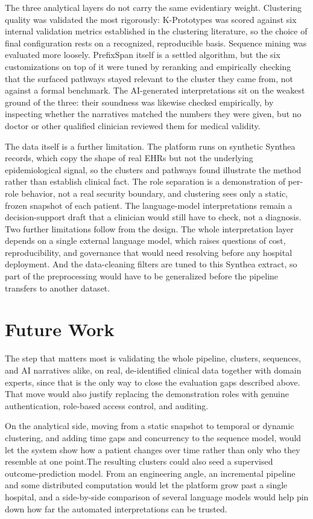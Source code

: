 The three analytical layers do not carry the same evidentiary weight. Clustering quality was validated the most rigorously: K-Prototypes was scored against six internal validation metrics established in the clustering literature, so the choice of final configuration rests on a recognized, reproducible basis. Sequence mining was evaluated more loosely. PrefixSpan itself is a settled algorithm, but the six customizations on top of it were tuned by reranking and empirically checking that the surfaced pathways stayed relevant to the cluster they came from, not against a formal benchmark. The AI-generated interpretations sit on the weakest ground of the three: their soundness was likewise checked empirically, by inspecting whether the narratives matched the numbers they were given, but no doctor or other qualified clinician reviewed them for medical validity.

The data itself is a further limitation. The platform runs on synthetic Synthea records, which copy the shape of real EHRs but not the underlying epidemiological signal, so the clusters and pathways found illustrate the method rather than establish clinical fact. The role separation is a demonstration of per-role behavior, not a real security boundary, and clustering sees only a static, frozen snapshot of each patient. The language-model interpretations remain a decision-support draft that a clinician would still have to check, not a diagnosis. Two further limitations follow from the design. The whole interpretation layer depends on a single external language model, which raises questions of cost, reproducibility, and governance that would need resolving before any hospital deployment. And the data-cleaning filters are tuned to this Synthea extract, so part of the preprocessing would have to be generalized before the pipeline transfers to another dataset.

\section*{Future Work}

The step that matters most is validating the whole pipeline, clusters, sequences, and AI narratives alike, on real, de-identified clinical data together with domain experts, since that is the only way to close the evaluation gaps described above. That move would also justify replacing the demonstration roles with genuine authentication, role-based access control, and auditing.

On the analytical side, moving from a static snapshot to temporal or dynamic clustering, and adding time gaps and concurrency to the sequence model, would let the system show how a patient changes over time rather than only who they resemble at one point.The resulting clusters could also seed a supervised outcome-prediction model. From an engineering angle, an incremental pipeline and some distributed computation would let the platform grow past a single hospital, and a side-by-side comparison of several language models would help pin down how far the automated interpretations can be trusted.
